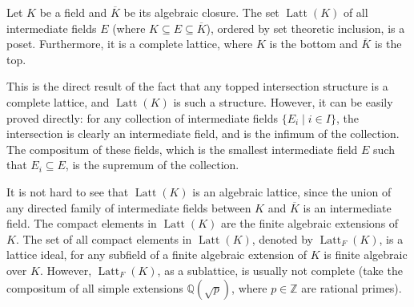\documentclass[12pt]{article}
\begin{document}
Let $K$ be a field and $\overline{K}$ be its algebraic closure.  The set $\operatorname{Latt}(K)$ of all intermediate fields $E$ (where $K\subseteq E\subseteq \overline{K}$), ordered by set theoretic inclusion, is a poset.  Furthermore, it is a complete lattice, where $K$ is the bottom and $\overline{K}$ is the top.

This is the direct result of the fact that any topped intersection structure is a complete lattice, and $\operatorname{Latt}(K)$ is such a structure.  However, it can be easily proved directly:  for any collection of intermediate fields $\lbrace E_i\mid i\in I\rbrace$, the intersection is clearly an intermediate field, and is the infimum of the collection.  The compositum of these fields, which is the smallest intermediate field $E$ such that $E_i\subseteq E$, is the supremum of the collection.

It is not hard to see that $\operatorname{Latt}(K)$ is an algebraic lattice, since the union of any directed family of intermediate fields between $K$ and $\overline{K}$ is an intermediate field.  The compact elements in $\operatorname{Latt}(K)$ are the finite algebraic extensions of $K$.  The set of all compact elements in $\operatorname{Latt}(K)$, denoted by $\operatorname{Latt}_F(K)$, is a lattice ideal, for any subfield of a finite algebraic extension of $K$ is finite algebraic over $K$.  However, $\operatorname{Latt}_F(K)$, as a sublattice, is usually not complete (take the compositum of all simple extensions $\mathbb{Q}(\sqrt{p})$, where $p\in \mathbb{Z}$ are rational primes).
\end{document}
